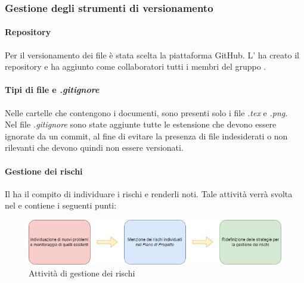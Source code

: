     \subsubsection{Gestione degli strumenti di versionamento}
      \paragraph{Repository\glo{}}
        Per il versionamento dei file è stata scelta la piattaforma GitHub\glo{}. L'\roleAdministratorLow{} ha creato il repository\glo{} e ha aggiunto 
        come collaboratori tutti i membri del gruppo \groupName{}.

      \paragraph{Tipi di file e \textit{.gitignore}}
        Nelle cartelle che contengono i documenti, sono presenti solo i file \textit{.tex} e \textit{.png}.\\
        Nel file \textit{.gitignore} sono state aggiunte tutte le estensione che devono essere ignorate da un commit, al fine di evitare la presenza di file indesiderati 
        o non rilevanti che devono quindi non essere versionati.
    \paragraph {Gestione dei rischi}
      Il \roleProjectManagerLow{} ha il compito di individuare i rischi e renderli noti. Tale attività verrà svolta nel \docNamePdPLow{} e contiene i seguenti punti:
      \begin{figure}[htbp]
        \centering 
        \includegraphics[scale =0.65]{../template/images/NdP/GestioneRischi.png}
        \caption{Attività di gestione dei rischi}
      \end {figure}
      
